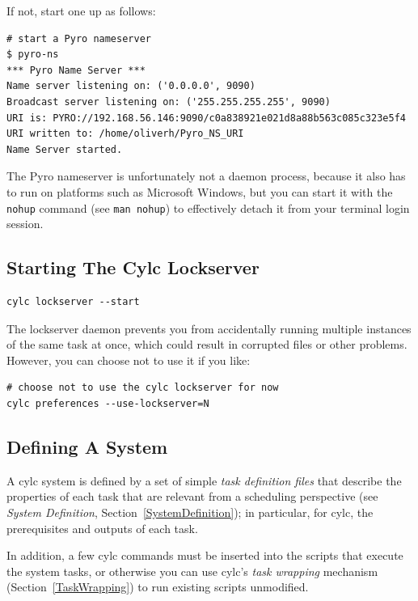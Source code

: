 \documentclass[11pt,a4paper]{article}
\begin{document}
If not, start one up as follows:

\begin{lstlisting}
# start a Pyro nameserver
$ pyro-ns
*** Pyro Name Server ***
Name server listening on: ('0.0.0.0', 9090)
Broadcast server listening on: ('255.255.255.255', 9090)
URI is: PYRO://192.168.56.146:9090/c0a838921e021d8a88b563c085c323e5f4
URI written to: /home/oliverh/Pyro_NS_URI
Name Server started.
\end{lstlisting}

The Pyro nameserver is unfortunately not a daemon process, because it
also has to run on platforms such as Microsoft Windows, but you can
start it with the \lstinline=nohup= command 
(see \lstinline=man nohup=) to effectively detach it from your terminal
login session.

\subsection{Starting The Cylc Lockserver}
\label{QuickStartingTheCylcLockserver}

\begin{lstlisting}
cylc lockserver --start
\end{lstlisting}

The lockserver daemon prevents you from accidentally running multiple
instances of the same task at once, which could result in corrupted
files or other problems. However, you can choose not to use it if you
like:

\begin{lstlisting}
# choose not to use the cylc lockserver for now
cylc preferences --use-lockserver=N
\end{lstlisting}


\subsection{Defining A System} 
\label{QuickDefiningASystem}

A cylc system is defined by a set of simple {\em task definition files}
that describe the properties of each task that are relevant from a
scheduling perspective (see {\em System Definition},
Section~\ref{SystemDefinition}); in particular, for cylc, the
prerequisites and outputs of each task.

In addition, a few cylc commands must be inserted into the scripts that
execute the system tasks, or otherwise you can use cylc's {\em task
wrapping} mechanism (Section~\ref{TaskWrapping}) to run existing scripts
unmodified.
\end{document}
